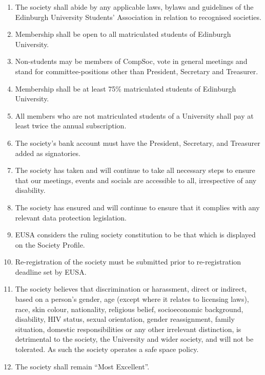 \documentclass{article}
\begin{document}
\begin{enumerate}
  \item The society shall abide by any applicable laws, bylaws and guidelines of the Edinburgh University Students’ Association in relation to recognised societies.

  \item Membership shall be open to all matriculated students of Edinburgh University.

  \item Non-students may be members of CompSoc, vote in general meetings and stand for committee-positions other than President, Secretary and Treasurer.

  \item Membership shall be at least 75\% matriculated students of Edinburgh University.

  \item All members who are not matriculated students of a University shall pay at least twice the annual subscription.

  \item The society’s bank account must have the President, Secretary, and Treasurer added as signatories.

  \item The society has taken and will continue to take all necessary steps to ensure that our meetings, events and socials are accessible to all, irrespective of any disability. 

  \item The society has ensured and will continue to ensure that it complies with any relevant data protection legislation.

  \item EUSA considers the ruling society constitution to be that which is displayed on the Society Profile.

  \item Re-registration of the society must be submitted prior to re-registration deadline set by EUSA.

  \item The society believes that discrimination or harassment, direct or indirect,
    based on a person’s gender, age (except where it relates to licensing
    laws), race, skin colour, nationality, religious belief, socioeconomic background,
    disability, HIV status, sexual orientation, gender reassignment,
    family situation, domestic responsibilities or any other irrelevant distinction,
    is detrimental to the society, the University and wider society, and
    will not be tolerated. As such the society operates a safe space policy.
    
  \item The society shall remain ``Most Excellent''.

\end{enumerate}
\end{document}
